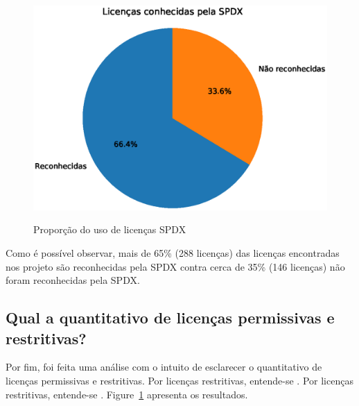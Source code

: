 \begin{figure}[H]
    \centering
    \caption{Proporção do uso de licenças SPDX}
    \includegraphics[scale=0.8]{figuras/resultados/pizza_licencas_conhecidas.eps}
    \label{local-licencas-raiz}
\end{figure}

Como é possível observar, mais de 65\% (288 licenças) das licenças encontradas nos projeto são reconhecidas pela SPDX contra cerca de 35\% (146 licenças) não foram reconhecidas pela SPDX.  


\subsection{Qual a quantitativo de licenças permissivas e restritivas?}\label{sec:comp}

Por fim, foi feita uma análise com o intuito de esclarecer o quantitativo de licenças permissivas e restritivas. Por licenças restritivas, entende-se . Por licenças restritivas, entende-se . Figure~\ref{local-licencas-raiz} apresenta os resultados.


